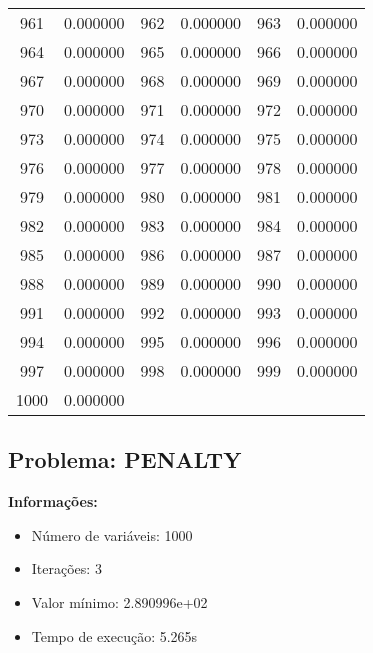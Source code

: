 \documentclass[12pt]{article}
\begin{document}
\begin{longtable}{@{}cc|cc|cc@{}}
961 & 0.000000 & 962 & 0.000000 & 963 & 0.000000 \\
964 & 0.000000 & 965 & 0.000000 & 966 & 0.000000 \\
967 & 0.000000 & 968 & 0.000000 & 969 & 0.000000 \\
970 & 0.000000 & 971 & 0.000000 & 972 & 0.000000 \\
973 & 0.000000 & 974 & 0.000000 & 975 & 0.000000 \\
976 & 0.000000 & 977 & 0.000000 & 978 & 0.000000 \\
979 & 0.000000 & 980 & 0.000000 & 981 & 0.000000 \\
982 & 0.000000 & 983 & 0.000000 & 984 & 0.000000 \\
985 & 0.000000 & 986 & 0.000000 & 987 & 0.000000 \\
988 & 0.000000 & 989 & 0.000000 & 990 & 0.000000 \\
991 & 0.000000 & 992 & 0.000000 & 993 & 0.000000 \\
994 & 0.000000 & 995 & 0.000000 & 996 & 0.000000 \\
997 & 0.000000 & 998 & 0.000000 & 999 & 0.000000 \\
1000 & 0.000000 &  &  &  &  \\

\end{longtable}


\newpage            
\subsection{Problema: PENALTY}

\textbf{Informações:}
\begin{itemize}
\item Número de variáveis: 1000
\item Iterações: 3
\item Valor mínimo: 2.890996e+02
\item Tempo de execução: 5.265s
\end{itemize}
\end{document}
